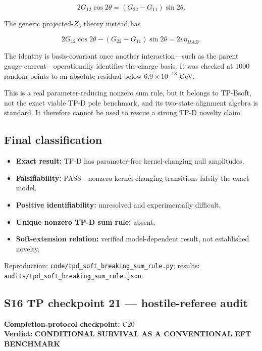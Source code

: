 \documentclass[
]{article}
\providecommand{\tightlist}{%
  \setlength{\itemsep}{0pt}\setlength{\parskip}{0pt}}
\begin{document}
\[
2G_{12}\cos2\theta=(G_{22}-G_{11})\sin2\theta.
\]

The generic projected-\(Z_3\) theory instead has

\[
2G_{12}\cos2\theta-(G_{22}-G_{11})\sin2\theta=2v\eta_{HAB}.
\]

The identity is basis-covariant once another interaction---such as the
parent gauge current---operationally identifies the charge basis. It was
checked at 1000 random points to an absolute residual below
\(6.9\times10^{-13}\) GeV.

This is a real parameter-reducing nonzero sum rule, but it belongs to
TP-Bsoft, not the exact viable TP-D pole benchmark, and its two-state
alignment algebra is standard. It therefore cannot be used to rescue a
strong TP-D novelty claim.

\hypertarget{final-classification}{%
\subsection{Final classification}\label{final-classification}}

\begin{itemize}
\tightlist
\item
  \textbf{Exact result:} TP-D has parameter-free kernel-changing null
  amplitudes.
\item
  \textbf{Falsifiability:} PASS---nonzero kernel-changing transitions
  falsify the exact model.
\item
  \textbf{Positive identifiability:} unresolved and experimentally
  difficult.
\item
  \textbf{Unique nonzero TP-D sum rule:} absent.
\item
  \textbf{Soft-extension relation:} verified model-dependent result, not
  established novelty.
\end{itemize}

Reproduction: \texttt{code/tpd\_soft\_breaking\_sum\_rule.py}; results:
\texttt{audits/tpd\_soft\_breaking\_sum\_rule.json}.

\newpage

\hypertarget{s16-tp-checkpoint-21-hostile-referee-audit}{%
\subsection{S16 TP checkpoint 21 --- hostile-referee
audit}\label{s16-tp-checkpoint-21-hostile-referee-audit}}

\textbf{Completion-protocol checkpoint:} C20\\
\textbf{Verdict:} \textbf{CONDITIONAL SURVIVAL AS A CONVENTIONAL EFT
BENCHMARK}
\end{document}
